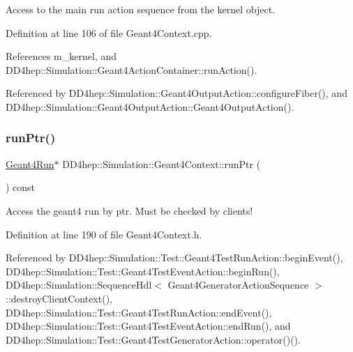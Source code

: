 Access to the main run action sequence from the kernel object. 



Definition at line 106 of file Geant4\+Context.\+cpp.



References m\+\_\+kernel, and D\+D4hep\+::\+Simulation\+::\+Geant4\+Action\+Container\+::run\+Action().



Referenced by D\+D4hep\+::\+Simulation\+::\+Geant4\+Output\+Action\+::configure\+Fiber(), and D\+D4hep\+::\+Simulation\+::\+Geant4\+Output\+Action\+::\+Geant4\+Output\+Action().

\hypertarget{class_d_d4hep_1_1_simulation_1_1_geant4_context_afa68af67dfcc2bcdb1de8fb345254e07}{}\label{class_d_d4hep_1_1_simulation_1_1_geant4_context_afa68af67dfcc2bcdb1de8fb345254e07} 
\subsubsection{\texorpdfstring{run\+Ptr()}{runPtr()}}
{\footnotesize\ttfamily \hyperlink{class_d_d4hep_1_1_simulation_1_1_geant4_run}{Geant4\+Run}$\ast$ D\+D4hep\+::\+Simulation\+::\+Geant4\+Context\+::run\+Ptr (\begin{DoxyParamCaption}{ }\end{DoxyParamCaption}) const\hspace{0.3cm}{\ttfamily [inline]}}



Access the geant4 run by ptr. Must be checked by clients! 



Definition at line 190 of file Geant4\+Context.\+h.



Referenced by D\+D4hep\+::\+Simulation\+::\+Test\+::\+Geant4\+Test\+Run\+Action\+::begin\+Event(), D\+D4hep\+::\+Simulation\+::\+Test\+::\+Geant4\+Test\+Event\+Action\+::begin\+Run(), D\+D4hep\+::\+Simulation\+::\+Sequence\+Hdl$<$ Geant4\+Generator\+Action\+Sequence $>$\+::destroy\+Client\+Context(), D\+D4hep\+::\+Simulation\+::\+Test\+::\+Geant4\+Test\+Run\+Action\+::end\+Event(), D\+D4hep\+::\+Simulation\+::\+Test\+::\+Geant4\+Test\+Event\+Action\+::end\+Run(), and D\+D4hep\+::\+Simulation\+::\+Test\+::\+Geant4\+Test\+Generator\+Action\+::operator()().

